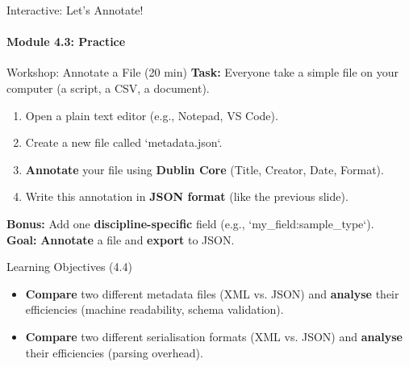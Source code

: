 \begin{frame}{Interactive: Let's Annotate!}
    \framesubtitle{Module 4.3: Practice}
    \begin{block}{Workshop: Annotate a File (20 min)}
        \textbf{Task:} Everyone take a simple file on your computer (a script, a CSV, a document).
        \pause
        \begin{enumerate}
            \item Open a plain text editor (e.g., Notepad, VS Code).
            \item Create a new file called `metadata.json`.
            \item \textbf{Annotate} your file using \textbf{Dublin Core} (Title, Creator, Date, Format).
            \item Write this annotation in \textbf{JSON format} (like the previous slide).
        \end{enumerate}
        \pause
        \textbf{Bonus:} Add one \textbf{discipline-specific} field (e.g., `my\_field:sample\_type`). \\
        \pause
        \textbf{Goal:} \textbf{Annotate} a file and \textbf{export} to JSON.
    \end{block}
\end{frame}

\begin{frame}{Learning Objectives (4.4)}
    \begin{itemize}
        \item \textbf{Compare} two different metadata files (XML vs. JSON) and \textbf{analyse} their efficiencies (machine readability, schema validation).
        \item \textbf{Compare} two different serialisation formats (XML vs. JSON) and \textbf{analyse} their efficiencies (parsing overhead).
    \end{itemize}
\end{frame}

